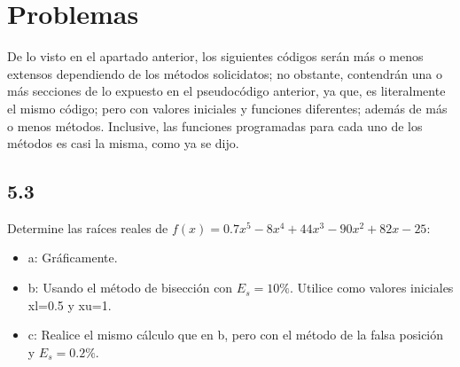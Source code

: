 \documentclass[12pt,oneside,FLEQN]{report}
\begin{document}
{	\section{Problemas}
	De lo visto en el apartado anterior, los siguientes códigos serán más o menos extensos dependiendo de los métodos solicidatos; no obstante, contendrán una o más secciones de lo expuesto en el pseudocódigo anterior, ya que, es literalmente el mismo código; pero con valores iniciales y funciones diferentes; además de más o menos métodos. Inclusive, las funciones programadas para cada uno de los métodos es casi la misma, como ya se dijo.
		\subsection{5.3}
		Determine las raíces reales de $f(x)=0.7x^5-8x^4+44x^3-90x^2+82x-25$:
		\begin{itemize}
			\item a: Gráficamente.
			\item b: Usando el método de bisección  con $E_{s}=10\%$. Utilice como valores iniciales xl=0.5 y xu=1.
			\item c: Realice el mismo cálculo que en b, pero con el método de la falsa posición y $E_{s}=0.2\%$.
		\end{itemize}
			
		\begin{figure}[!h]
			\centering

\end{figure}}
\end{document}
